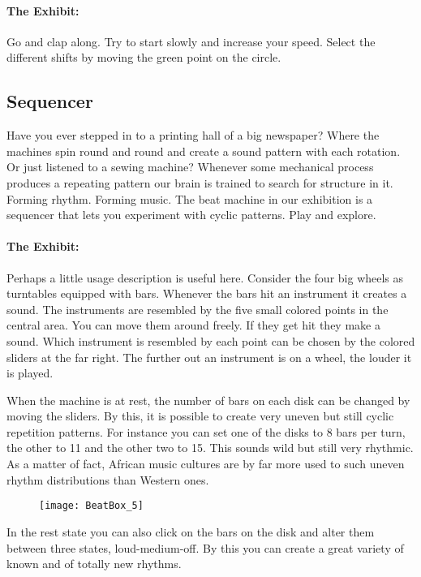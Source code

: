 \paragraph{The Exhibit:}
Go and clap along. Try to start slowly and increase your speed. Select the different shifts by moving the green point on the circle.

\vspace{12ex}

\subsection{Sequencer}
Have you ever stepped in to a printing hall of a big newspaper?
Where the machines spin round and round and create a sound pattern with each rotation. Or just listened to a sewing machine? Whenever some mechanical process produces a repeating pattern our brain is trained to search for structure in it. Forming rhythm. Forming music. The beat machine in our exhibition is a sequencer that lets you experiment with cyclic patterns. Play and explore.

\paragraph{The Exhibit:}
Perhaps a little usage description is useful here. Consider the four big wheels as turntables equipped with bars. Whenever the bars hit an instrument it creates a sound. The instruments are resembled by the five small colored points in the central area. You can move them around freely. If they get hit they make a sound. Which instrument is resembled by each point can be chosen by the colored sliders at the far right. The further out an instrument is on a wheel, the louder it is played.

When the machine is at rest, the number of bars on each disk can be changed by moving the sliders. By this, it is possible to create very uneven but still cyclic repetition patterns. For instance you can set one of the disks to 8 bars per turn, the other to 11 and the other two to 15. This sounds wild but still very rhythmic. As a matter of fact, African music cultures are by far more used to such uneven rhythm distributions than Western ones.

\begin{figure}[h]
\centering
\texttt{[image: BeatBox\_5]}
\end{figure}

In the rest state you can also click on the bars on the disk and alter them between three states, loud-medium-off. By this you can create a great variety of known and of totally new rhythms.


